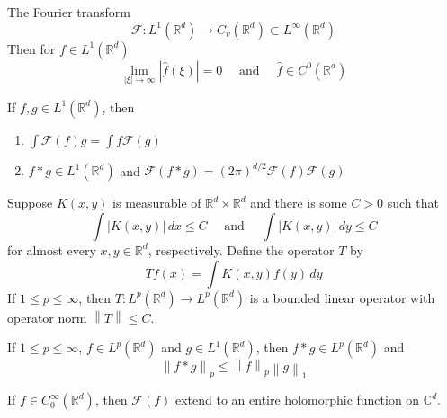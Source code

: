 \documentclass{article}
\newcommand{\norm}[1]{\left\lVert#1\right\rVert}
\newcommand{\RR}{\mathbb{R}}
\newcommand{\CC}{\mathbb{C}}
\newcommand{\FT}{\mathcal{F}}
\begin{document}
\begin{theorem}
  The Fourier transform
  \begin{equation*}
    \mathcal{F}: L^1(\mathbb{R}^d) \to C_v(\mathbb{R}^d) \subset L^\infty(\mathbb{R}^d)
  \end{equation*}
  Then for $f \in L^1(\mathbb{R}^d)$
  \begin{equation*}
    \lim_{|\xi| \to \infty}|\hat{f}(\xi)| = 0 \quad \text{ and } \quad \hat{f} \in C^0(\mathbb{R}^d)
  \end{equation*}
\end{theorem}
\begin{proposition}
  If $f,g \in L^1(\mathbb{R}^d)$, then
  \begin{enumerate}
    \item $\int \mathcal{F}(f)g = \int f\mathcal{F}(g)$ 
  \item $f * g \in L^1(\mathbb{R}^d)$ and $\mathcal{F}(f * g) = (2\pi)^{d/2}\mathcal{F}(f)\mathcal{F}(g)$
  \end{enumerate}
\end{proposition}
\begin{theorem}
  Suppose $K(x,y)$ is measurable of $\RR^d \times \RR^d$ and there is some $C > 0$ such that
  \begin{equation*}
    \int |K(x,y)| \, dx \leq C \quad \text{ and } \quad \int |K(x,y)| \, dy \leq C
  \end{equation*}
  for almost every $x,y \in \RR^d$, respectively. Define the operator $T$ by
  \begin{equation*}
    Tf(x) = \int K(x,y) f(y) \, dy
  \end{equation*}
  If $1 \leq p \leq \infty$, then $T: L^p(\RR^d) \to L^p(\RR^d)$ is a bounded linear operator with operator norm $\norm{T} \leq C$.
\end{theorem}
\begin{proposition}
  If $1 \leq p \leq \infty$, $f \in L^p(\RR^d)$ and $g \in L^1(\RR^d)$, then $f * g \in L^p(\RR^d)$ and
  \begin{equation*}
    \norm{f * g}_p \leq \norm{f}_p \norm{g}_1
  \end{equation*}
\end{proposition}

\begin{theorem}
  If $f \in C_0^\infty(\RR^d)$, then $\FT(f)$ extend to an entire holomorphic function on $\CC^d$.
\end{theorem}
\newpage





\end{document}
